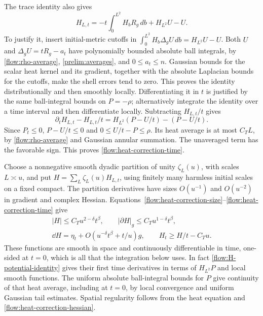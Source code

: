 The trace identity also gives
\begin{equation}\label{flow:H-potential-identity}
 H_{L,t}=-t\int_0^{L^2}H_bR_g\,db+H_{L^2}U-U.
\end{equation}
To justify it, insert initial-metric cutoffs in
$\int_0^{L^2}H_b\Delta_gU\,db=H_{L^2}U-U$.
Both $U$ and $\Delta_gU=tR_g-a_t$ have polynomially bounded absolute
ball integrals, by \eqref{flow:rho-average},
\eqref{prelim:averages}, and $0\le a_t\le n$.
Gaussian bounds for the scalar heat kernel and its gradient, together
with the absolute Laplacian bounds for the cutoffs, make the shell
errors tend to zero.  This proves the identity distributionally and
then smoothly locally.  Differentiating it in $t$ is justified by
the same ball-integral bounds on $P=-\rho$; alternatively integrate
the identity over a time interval and then differentiate locally.
Subtracting $H_{L,t}/t$ gives
\[
 \partial_tH_{L,t}-H_{L,t}/t
 =H_{L^2}(P-U/t)-(P-U/t).
\]
Since $P_t\le0$, $P-U/t\le0$ and $0\le U/t-P\le\rho$.
Its heat average is at most $C_TL$, by
\eqref{flow:rho-average} and Gaussian annular summation.  The
unaveraged term has the favorable sign.  This proves
\eqref{flow:heat-correction-time}.

Choose a nonnegative smooth dyadic partition of unity $\zeta_L(u)$,
with scales $L\asymp u$, and put
$H=\sum_L\zeta_L(u)H_{L,t}$, using finitely many harmless initial
scales on a fixed compact.  The partition derivatives have sizes
$O(u^{-1})$ and $O(u^{-2})$ in gradient and complex Hessian.
Equations~\eqref{flow:heat-correction-size}--\eqref{flow:heat-correction-time}
give
\begin{equation}\label{flow:glued-correction}
 \begin{gathered}
 |H|\le C_Tu^{2-\delta}t^\beta,
 \qquad |\partial H|_g\le C_Tu^{1-\delta}t^\beta,\\
 \dd H=\eta_t+O(u^{-\delta}t^\beta+t/u)g,
 \qquad H_t\ge H/t-C_Tu.
 \end{gathered}
\end{equation}
These functions are smooth in space and continuously differentiable
in time, one-sided at $t=0$, which is all that the integration below
uses.  In fact \eqref{flow:H-potential-identity} gives their first
time derivatives in terms of $H_{L^2}P$ and local smooth functions.
The uniform absolute ball-integral bounds for $P$ give continuity of
that heat average, including at $t=0$, by local convergence and
uniform Gaussian tail estimates.  Spatial regularity follows from
the heat equation and \eqref{flow:heat-correction-hessian}.

